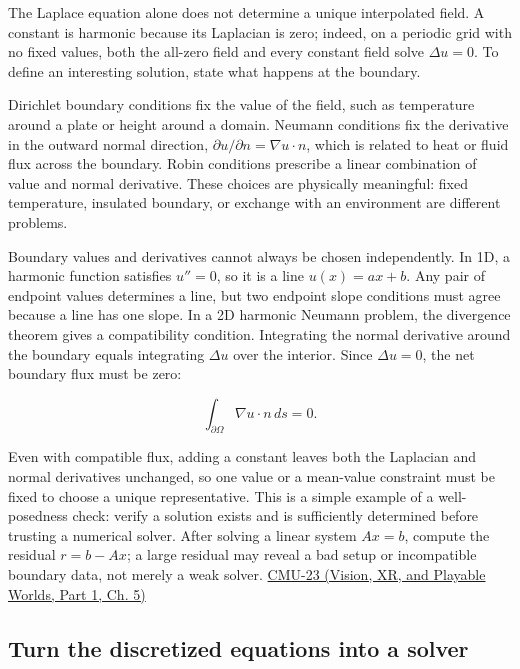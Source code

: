 The Laplace equation alone does not determine a unique interpolated field. A constant is harmonic because its Laplacian is zero; indeed, on a periodic grid with no fixed values, both the all-zero field and every constant field solve \(\Delta u=0\). To define an interesting solution, state what happens at the boundary.

Dirichlet boundary conditions fix the value of the field, such as temperature around a plate or height around a domain. Neumann conditions fix the derivative in the outward normal direction, \(\partial u/\partial n=\nabla u\cdot n\), which is related to heat or fluid flux across the boundary. Robin conditions prescribe a linear combination of value and normal derivative. These choices are physically meaningful: fixed temperature, insulated boundary, or exchange with an environment are different problems.

Boundary values and derivatives cannot always be chosen independently. In 1D, a harmonic function satisfies \(u''=0\), so it is a line \(u(x)=ax+b\). Any pair of endpoint values determines a line, but two endpoint slope conditions must agree because a line has one slope. In a 2D harmonic Neumann problem, the divergence theorem gives a compatibility condition. Integrating the normal derivative around the boundary equals integrating \(\Delta u\) over the interior. Since \(\Delta u=0\), the net boundary flux must be zero:

\[
\int_{\partial\Omega}\nabla u\cdot n\,ds=0.
\]

Even with compatible flux, adding a constant leaves both the Laplacian and normal derivatives unchanged, so one value or a mean-value constraint must be fixed to choose a unique representative. This is a simple example of a well-posedness check: verify a solution exists and is sufficiently determined before trusting a numerical solver. After solving a linear system \(Ax=b\), compute the residual \(r=b-Ax\); a large residual may reveal a bad setup or incompatible boundary data, not merely a weak solver. \href{../07-Vision-XR-and-Playable-Worlds-P01/main.pdf\#nameddest=04-visual-computing-ii-ch036-cmu-23---physically-based-animation-and-pdes}{CMU-23 (Vision, XR, and Playable Worlds, Part 1, Ch. 5)}

\subsection{Turn the discretized equations into a solver}\label{04-visual-computing-ii-ch030-turn-the-discretized-equations-into-a-solver}

